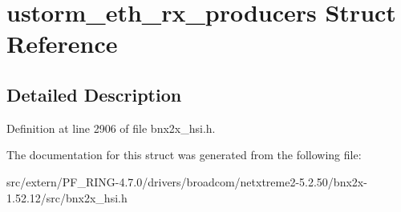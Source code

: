 \hypertarget{structustorm__eth__rx__producers}{
\section{ustorm\_\-eth\_\-rx\_\-producers Struct Reference}
\label{structustorm__eth__rx__producers}
}


\subsection{Detailed Description}


Definition at line 2906 of file bnx2x\_\-hsi.h.



The documentation for this struct was generated from the following file:\begin{DoxyCompactItemize}
\item 
src/extern/PF\_\-RING-\/4.7.0/drivers/broadcom/netxtreme2-\/5.2.50/bnx2x-\/1.52.12/src/bnx2x\_\-hsi.h\end{DoxyCompactItemize}
